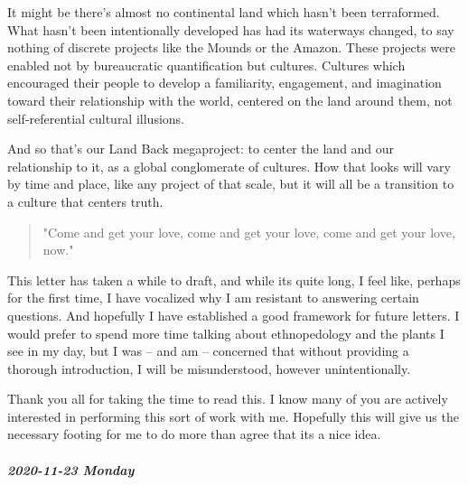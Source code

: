 \documentclass[11pt]{article}
\begin{document}
\begin{itemize}
\begin{itemize}
It might be there’s almost no continental land which hasn’t been terraformed. What hasn’t been intentionally developed has had its waterways changed, to say nothing of discrete projects like the Mounds or the Amazon. These projects were enabled not by bureaucratic quantification but cultures. Cultures which encouraged their people to develop a familiarity, engagement, and imagination toward their relationship with the world, centered on the land around them, not self-referential cultural illusions.

And so that’s our Land Back megaproject: to center the land and our relationship to it, as a global conglomerate of cultures. How that looks will vary by time and place, like any project of that scale, but it will all be a transition to a culture that centers truth.

\begin{quote}
"Come and get your love, come and get your love, come and get your love, now."
\end{quote}

This letter has taken a while to draft, and while its quite long, I feel like, perhaps for the first time, I have vocalized why I am resistant to answering certain questions. And hopefully I have established a good framework for future letters. I would prefer to spend more time talking about ethnopedology and the plants I see in my day, but I was – and am – concerned that without providing a thorough introduction, I will be misunderstood, however unintentionally.

Thank you all for taking the time to read this. I know many of you are actively interested in performing this sort of work with me. Hopefully this will give us the necessary footing for me to do more than agree that its a nice idea.
\end{itemize}
\end{itemize}
\subparagraph*{2020-11-23 Monday}
\label{sec:orga19d8e3}
\end{document}
